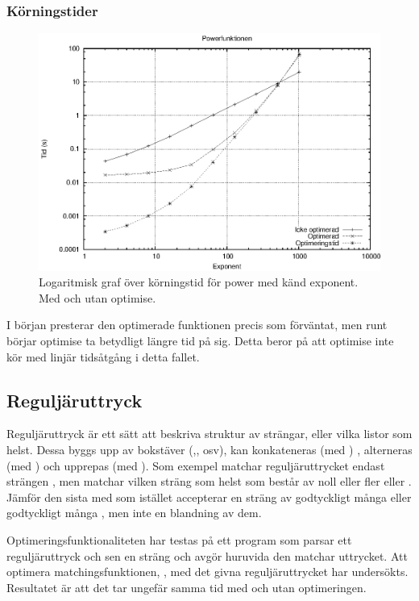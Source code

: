 \documentclass[Rapport]{subfiles}
\begin{document}
\subsubsection{Körningstider}


\begin{figure}[H]
\includegraphics{power.eps}
\caption{Logaritmisk graf över körningstid för power med känd exponent.
Med och utan optimise.}
\label{fig:Resultat:shapes:graf}
\end{figure}

I början presterar den optimerade funktionen precis som förväntat, men runt 
börjar optimise ta betydligt längre tid på sig. Detta beror på att optimise inte kör med linjär tidsåtgång i detta fallet. 


\subsection{Reguljäruttryck}

Reguljäruttryck är ett sätt att beskriva struktur av strängar, eller vilka
listor som helst. Dessa byggs upp av bokstäver
(,, osv), 
kan konkateneras (med ) 
, alterneras (med \ic{|})
 och upprepas (med \ic{*}). 
Som exempel matchar reguljäruttrycket  endast strängen ,
men  matchar vilken sträng som helst som består av noll eller fler
 eller . Jämför den sista med  som istället accepterar
en sträng av godtyckligt många  eller godtyckligt många , men inte 
en blandning av dem.

Optimeringsfunktionaliteten har testas på ett program som parsar ett reguljäruttryck
och sen en sträng och avgör huruvida den matchar uttrycket. Att optimera 
matchingsfunktionen, , med det givna
reguljäruttrycket har undersökts. Resultatet är att det tar ungefär samma
tid med och utan optimeringen. 
\end{document}

